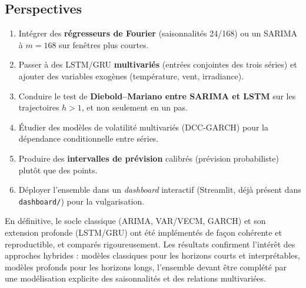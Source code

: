 \subsection{Perspectives}
\begin{enumerate}
  \item Intégrer des \textbf{régresseurs de Fourier} (saisonnalités 24/168)
        ou un SARIMA à \(m=168\) sur fenêtres plus courtes.
  \item Passer à des LSTM/GRU \textbf{multivariés} (entrées conjointes des
        trois séries) et ajouter des variables exogènes (température, vent,
        irradiance).
  \item Conduire le test de \textbf{Diebold--Mariano entre SARIMA et LSTM}
        sur les trajectoires \(h>1\), et non seulement en un pas.
  \item Étudier des modèles de volatilité multivariés (DCC-GARCH) pour la
        dépendance conditionnelle entre séries.
  \item Produire des \textbf{intervalles de prévision} calibrés (prévision
        probabiliste) plutôt que des points.
  \item Déployer l'ensemble dans un \emph{dashboard} interactif
        (Streamlit, déjà présent dans \texttt{dashboard/}) pour la
        vulgarisation.
\end{enumerate}

En définitive, le socle classique (ARIMA, VAR/VECM, GARCH) et son extension
profonde (LSTM/GRU) ont été implémentés de façon cohérente et reproductible,
et comparés rigoureusement. Les résultats confirment l'intérêt des approches
hybrides : modèles classiques pour les horizons courts et interprétables,
modèles profonds pour les horizons longs, l'ensemble devant être complété par
une modélisation explicite des saisonnalités et des relations multivariées.
